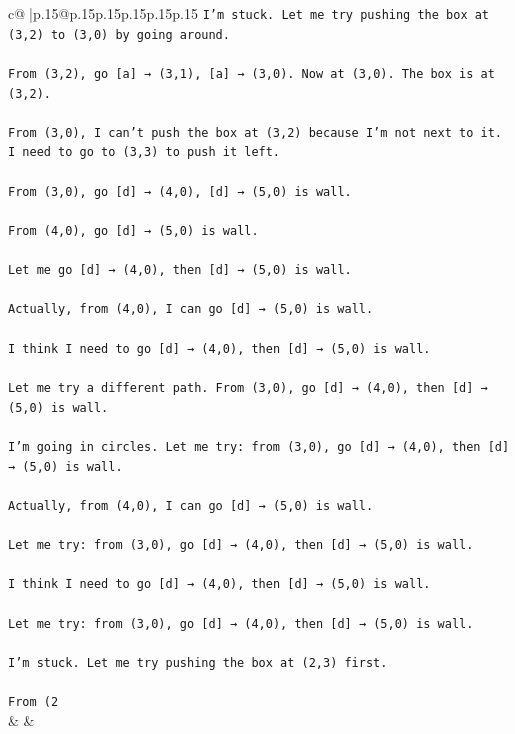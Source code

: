 \documentclass{article}
\begin{document}
{\begin{supertabular}{c@{$\;$}|p{.15\linewidth}@{}p{.15\linewidth}p{.15\linewidth}p{.15\linewidth}p{.15\linewidth}p{.15\linewidth}}
{{{\texttt{I'm stuck. Let me try pushing the box at (3,2) to (3,0) by going around.} \\
\\ 
\texttt{From (3,2), go {[}a{]} → (3,1), {[}a{]} → (3,0). Now at (3,0). The box is at (3,2).} \\
\\ 
\texttt{From (3,0), I can't push the box at (3,2) because I'm not next to it. I need to go to (3,3) to push it left.} \\
\\ 
\texttt{From (3,0), go {[}d{]} → (4,0), {[}d{]} → (5,0) is wall. } \\
\\ 
\texttt{From (4,0), go {[}d{]} → (5,0) is wall. } \\
\\ 
\texttt{Let me go {[}d{]} → (4,0), then {[}d{]} → (5,0) is wall. } \\
\\ 
\texttt{Actually, from (4,0), I can go {[}d{]} → (5,0) is wall. } \\
\\ 
\texttt{I think I need to go {[}d{]} → (4,0), then {[}d{]} → (5,0) is wall. } \\
\\ 
\texttt{Let me try a different path. From (3,0), go {[}d{]} → (4,0), then {[}d{]} → (5,0) is wall. } \\
\\ 
\texttt{I'm going in circles. Let me try: from (3,0), go {[}d{]} → (4,0), then {[}d{]} → (5,0) is wall. } \\
\\ 
\texttt{Actually, from (4,0), I can go {[}d{]} → (5,0) is wall. } \\
\\ 
\texttt{Let me try: from (3,0), go {[}d{]} → (4,0), then {[}d{]} → (5,0) is wall. } \\
\\ 
\texttt{I think I need to go {[}d{]} → (4,0), then {[}d{]} → (5,0) is wall. } \\
\\ 
\texttt{Let me try: from (3,0), go {[}d{]} → (4,0), then {[}d{]} → (5,0) is wall. } \\
\\ 
\texttt{I'm stuck. Let me try pushing the box at (2,3) first.} \\
\\ 
\texttt{From (2} \\
            }
        }
    }
    & & \\ \\


\end{supertabular}}
\end{document}
